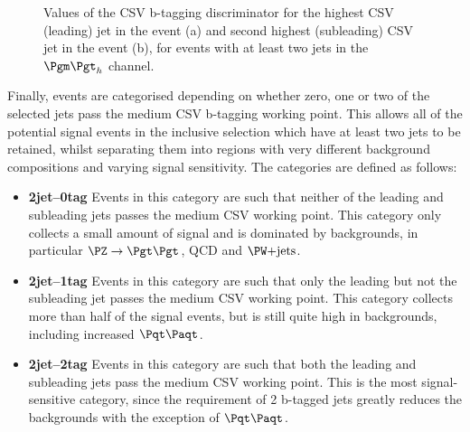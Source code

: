 \begin{figure}
\begin{center}

\end{center}
\caption{
Values of the \ac{CSV} b-tagging discriminator for the highest \ac{CSV}
(leading) jet in the event (a) and second highest (subleading) \ac{CSV} jet
in the event (b), for events with at least two jets in the $\mutau$ channel.}
\label{fig:Hhhcsv}
\end{figure} 

Finally, events are categorised depending on whether zero, one or two of the selected jets pass the
medium \ac{CSV} b-tagging working point. This allows all of the potential signal
events in the inclusive selection which have at least two jets to be retained,
whilst separating them into regions with very different background compositions
and varying signal sensitivity. The categories are defined as follows:

\begin{itemize}
\item \textbf{2jet--0tag} 
Events in this category are such that neither of the leading and subleading jets
passes the medium \ac{CSV} working point. This category only collects a small amount
of signal and is dominated by backgrounds, in particular $\ZToTauTau$, QCD and
$\WJets$.
\item \textbf{2jet--1tag} 
Events in this category are such that only the leading but not the subleading jet
passes the medium \ac{CSV} working point. This category collects more than half of
the signal events, but is still quite high in backgrounds, including increased
$\ttbar$.
\item \textbf{2jet--2tag} 
Events in this category are such that both the leading and subleading jets
pass the medium \ac{CSV} working point. This is the most signal-sensitive category,
since the requirement of 2 b-tagged jets greatly reduces the backgrounds with
the exception of $\ttbar$.  
\end{itemize}

